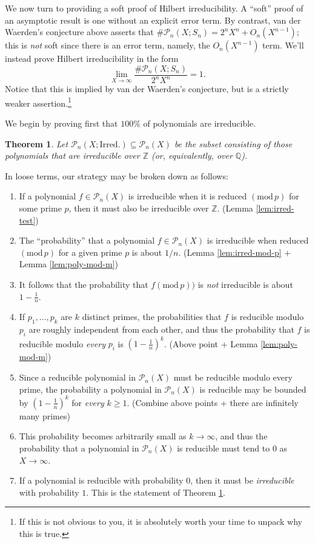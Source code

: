 \documentclass[12pt]{amsart}
\newtheorem{theorem}{Theorem}
\theoremstyle{definition} \newtheorem*{notation}{Notation}
\theoremstyle{remark} \newtheorem*{remark}{Remark}
\theoremstyle{remark} \newtheorem*{example}{Example}
\theoremstyle{definition} \newtheorem*{definition}{Definition}
\numberwithin{equation}{section}
\numberwithin{theorem}{section}
\renewcommand{\pmod}[1]{\left(\mathrm{mod}\,#1\right)}
\begin{document}
	We now turn to providing a soft proof of Hilbert irreducibility.  A ``soft'' proof of an asymptotic result is one without an explicit error term.  By contrast, van der Waerden's conjecture above asserts that $\# \mathcal{P}_n(X;S_n) = 2^n X^n + O_n(X^{n-1})$; this is \emph{not} soft since there is an error term, namely, the $O_n(X^{n-1})$ term.  We'll instead prove Hilbert irreducibility in the form
		\[
			\lim_{X \to \infty} \frac{\# \mathcal{P}_n(X;S_n)}{2^n X^n} = 1.
		\]
	Notice that this is implied by van der Waerden's conjecture, but is a strictly weaker assertion.\footnote{If this is not obvious to you, it is absolutely worth your time to unpack why this is true.}
	
	We begin by proving first that $100\%$ of polynomials are irreducible.
	
	\begin{theorem}\label{thm:irreducible-100}
		Let $\mathcal{P}_n(X;\mathrm{Irred.}) \subseteq \mathcal{P}_n(X)$ be the subset consisting of those polynomials that are irreducible over $\mathbb{Z}$ (or, equivalently, over $\mathbb{Q}$).
	\end{theorem}
	
	In loose terms, our strategy may be broken down as follows:
		\begin{enumerate}
			\item If a polynomial $f \in \mathcal{P}_n(X)$ is irreducible when it is reduced $\pmod{p}$ for some prime $p$, then it must also be irreducible over $\mathbb{Z}$.  (Lemma \ref{lem:irred-test})
			\item The ``probability'' that a polynomial $f \in \mathcal{P}_n(X)$ is irreducible when reduced $\pmod{p}$ for a given prime $p$ is about $1/n$.  (Lemma \ref{lem:irred-mod-p} + Lemma \ref{lem:poly-mod-m})
			\item It follows that the probability that $f \pmod{p})$ is \emph{not} irreducible is about $1-\frac{1}{n}$.
			\item If $p_1,\dots,p_k$ are $k$ distinct primes, the probabilities that $f$ is reducible modulo $p_i$ are roughly independent from each other, and thus the probability that $f$ is reducible modulo \emph{every} $p_i$ is $(1-\frac{1}{n})^k$.  (Above point + Lemma \ref{lem:poly-mod-m})
			\item Since a reducible polynomial in $\mathcal{P}_n(X)$ must be reducible modulo every prime, the probability a polynomial in $\mathcal{P}_n(X)$ is reducible may be bounded by $(1-\frac{1}{n})^k$ for \emph{every} $k \geq 1$.  (Combine above points + there are infinitely many primes)
			\item This probability becomes arbitrarily small as $k \to \infty$, and thus the probability that a polynomial in $\mathcal{P}_n(X)$ is reducible must tend to $0$ as $X \to \infty$.
			\item If a polynomial is reducible with probability $0$, then it must be \emph{irreducible} with probability $1$.  This is the statement of Theorem \ref{thm:irreducible-100}.
		\end{enumerate}
	
\end{document}
